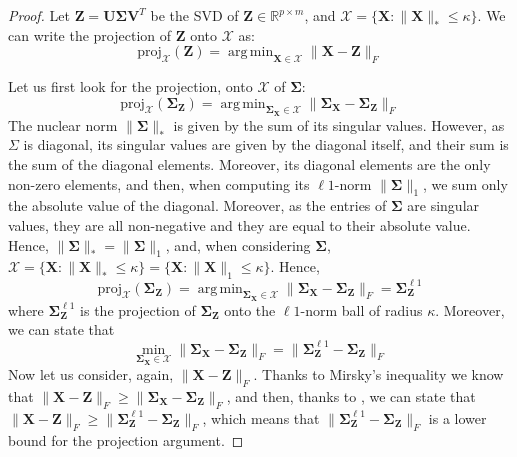 \documentclass[12pt]{article}
\DeclareMathOperator*{\argmin}{arg\,min}
\newcommand{\boldZ}{\mathbf{Z}}
\newcommand{\boldX}{\mathbf{X}}
\newcommand{\boldU}{\mathbf{U}}
\newcommand{\boldV}{\mathbf{V}}
\newcommand{\setX}{\mathcal{X}}
\newcommand{\boldS}{\mathbf{\Sigma}}
\newcommand*{\proj}{\text{proj}}
\begin{document}
\begin{proof}
Let $\boldZ = \boldU\boldS\boldV^T$ be the SVD of $\boldZ \in \mathbb{R}^{p \times m}$, and $\setX = \{ \boldX : \lVert \boldX \rVert_{*} \leq \kappa \}$. We can write the projection of $\boldZ$ onto $\setX$ as:
\begin{equation}
    \proj_{\setX}(\boldZ) = \argmin_{\boldX \in \setX} \lVert \boldX - \boldZ \rVert_{F}
\end{equation}

Let us first look for the projection, onto $\setX$ of $\boldS$:
\begin{equation}
    \proj_{\setX}(\boldS_{\boldZ}) = \argmin_{\boldS_{\boldX} \in \setX} \lVert \boldS_{\boldX} - \boldS_{\boldZ} \rVert_{F}
\end{equation}
The nuclear norm $\lVert \boldS \rVert_{*}$ is given by the sum of its singular values. However, as $\Sigma$ is diagonal, its singular values are given by the diagonal itself, and their sum is the sum of the diagonal elements. Moreover, its diagonal elements are the only non-zero elements, and then, when computing its $\ell1$-norm $\lVert \boldS \rVert_{1}$, we sum only the absolute value of the diagonal. Moreover, as the entries of $\boldS$ are singular values, they are all non-negative and they are equal to their absolute value. Hence, $\lVert \boldS \rVert_{*} = \lVert \boldS \rVert_{1}$, and, when considering $\boldS$, $\setX = \{ \boldX : \lVert \boldX \rVert_{*} \leq \kappa \} = \{ \boldX : \lVert \boldX \rVert_{1} \leq \kappa \}$. Hence,
\begin{equation}
     \proj_{\setX}(\boldS_{\boldZ}) = \argmin_{\boldS_{\boldX} \in \setX} \lVert \boldS_{\boldX} - \boldS_{\boldZ} \rVert_{F} = \boldS_{\boldZ}^{\ell1}
\end{equation}
where $\boldS_{\boldZ}^{\ell1}$ is the projection of $\boldS_{\boldZ}$ onto the $\ell1$-norm ball of radius $\kappa$. Moreover, we can state that
\begin{equation}
    \min_{\boldS_{\boldX} \in \setX} \lVert \boldS_{\boldX} - \boldS_{\boldZ} \rVert_{F} = \lVert \boldS_{\boldZ}^{\ell1} - \boldS_{\boldZ} \rVert_{F} \label{eq:sigma-proj}    
\end{equation}
Now let us consider, again, $\lVert \boldX - \boldZ \rVert_{F}$. Thanks to Mirsky's inequality we know that $\lVert \boldX - \boldZ \rVert_{F} \geq \lVert \boldS_{\boldX} - \boldS_{\boldZ} \rVert_{F}$, and then, thanks to , we can state that $\lVert \boldX - \boldZ \rVert_{F} \geq \lVert \boldS_{\boldZ}^{\ell1} - \boldS_{\boldZ} \rVert_{F}$, which means that $\lVert \boldS_{\boldZ}^{\ell1} - \boldS_{\boldZ} \rVert_{F}$ is a lower bound for the projection argument.


\end{proof}
\end{document}
